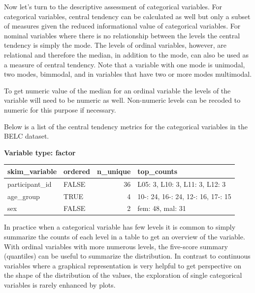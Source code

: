 \documentclass[
  letterpaper,
]{latex/krantz}
\begin{document}
Now let's turn to the descriptive assessment of categorical variables.
For categorical variables, central tendency can be calculated as well
but only a subset of measures given the reduced informational value of
categorical variables. For nominal variables where there is no
relationship between the levels the central tendency is simply the mode.
The levels of ordinal variables, however, are relational and therefore
the median, in addition to the mode, can also be used as a measure of
central tendency. Note that a variable with one mode is unimodal, two
modes, bimmodal, and in variables that have two or more modes
multimodal.

\begin{tcolorbox}[enhanced jigsaw, colframe=quarto-callout-warning-color-frame, titlerule=0mm, coltitle=black, colback=white, opacitybacktitle=0.6, colbacktitle=quarto-callout-warning-color!10!white, left=2mm, arc=.35mm, leftrule=.75mm, rightrule=.15mm, bottomtitle=1mm, toptitle=1mm, breakable, bottomrule=.15mm, title=\textcolor{quarto-callout-warning-color}{\faExclamationTriangle}\hspace{0.5em}{Tip}, toprule=.15mm, opacityback=0]

To get numeric value of the median for an ordinal variable the levels of
the variable will need to be numeric as well. Non-numeric levels can be
recoded to numeric for this purpose if necessary.

\end{tcolorbox}

Below is a list of the central tendency metrics for the categorical
variables in the BELC dataset.

\textbf{Variable type: factor}

\begin{tabular}{l|l|r|l}
\hline
skim\_variable & ordered & n\_unique & top\_counts\\
\hline
participant\_id & FALSE & 36 & L05: 3, L10: 3, L11: 3, L12: 3\\
\hline
age\_group & TRUE & 4 & 10-: 24, 16-: 24, 12-: 16, 17-: 15\\
\hline
sex & FALSE & 2 & fem: 48, mal: 31\\
\hline
\end{tabular}

In practice when a categorical variable has few levels it is common to
simply summarize the counts of each level in a table to get an overview
of the variable. With ordinal variables with more numerous levels, the
five-score summary (quantiles) can be useful to summarize the
distribution. In contrast to continuous variables where a graphical
representation is very helpful to get perspective on the shape of the
distribution of the values, the exploration of single categorical
variables is rarely enhanced by plots.
\end{document}
